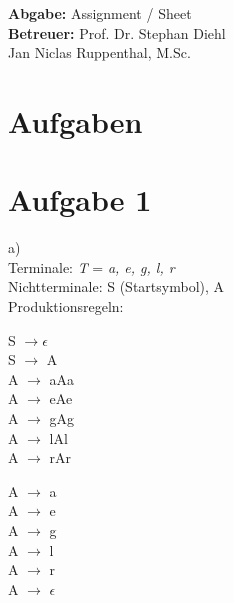 \documentclass[11pt,a4paper]{article}
\title{\course}
\author{\studentname\\Matrikelnummer: \studentnumber\\\institute}
\date{\today}
\begin{document}
\maketitle

\begin{center}
    \textbf{Abgabe:} Assignment / Sheet \\
    \vspace{4mm}
    \textbf{Betreuer:} Prof. Dr. Stephan Diehl\\Jan Niclas Ruppenthal, M.Sc.
\end{center}

\bigskip

\section*{Aufgaben}

\section{Aufgabe 1}
a) \\
    Terminale: \textit{T} = {\textit{a, e, g, l, r}}\\
    Nichtterminale: {S (Startsymbol), A}    
\\   
    Produktionsregeln: \\

\begin{center}    
    S $\rightarrow \epsilon$ \\
    S $\rightarrow$ A \\

    A $\rightarrow$ aAa \\
    A $\rightarrow$ eAe \\
    A $\rightarrow$ gAg \\
    A $\rightarrow$ lAl \\
    A $\rightarrow$ rAr \\

    A $\rightarrow$ a \\
    A $\rightarrow$ e \\
    A $\rightarrow$ g \\
    A $\rightarrow$ l \\
    A $\rightarrow$ r \\
    
    A $\rightarrow$ $\epsilon$ \\

\end{center}
\end{document}
